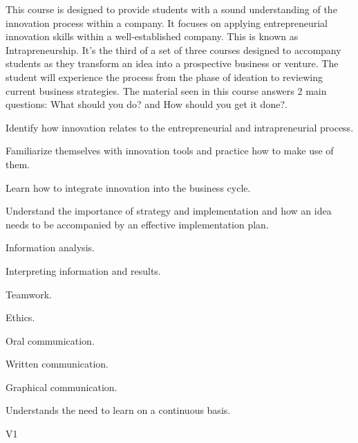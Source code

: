 \begin{syllabus}


\begin{justification}
This course is designed to provide students with a sound understanding of the innovation process within a company. It focuses on applying entrepreneurial innovation skills within a well-established company. This is known as Intrapreneurship.
It's the third of a set of three courses designed to accompany students as they transform an idea into a prospective business or venture. The student will experience the process from the phase of ideation to reviewing current business strategies. 
The material seen in this course answers 2 main questions: What should you do? and How should you get it done?. 
\end{justification}

\begin{goals}
\item Identify how innovation relates to the entrepreneurial and intrapreneurial process.
\item Familiarize themselves with innovation tools and practice how to make use of them.
\item Learn how to integrate innovation into the business cycle.
\item Understand the importance of strategy and implementation and how an idea needs to be accompanied by an effective implementation plan.
\item Information analysis.
\item Interpreting information and results.
\item Teamwork.
\item Ethics.
\item Oral communication.
\item Written communication.
\item Graphical communication.
\item Understands the need to learn on a continuous basis.

\end{goals}

\begin{outcomes}{V1}
    \item {} %
    \item {} %
    \item {} %
    \item {} %
    \item {} %
\end{outcomes}


\end{syllabus}
